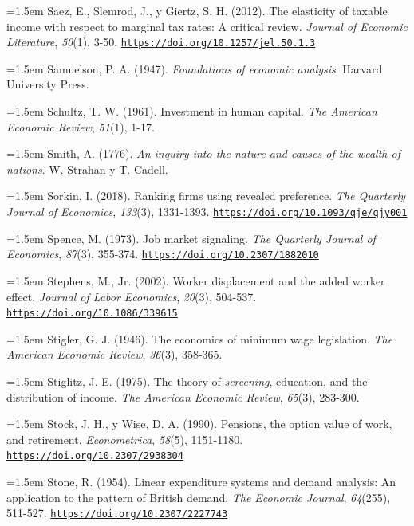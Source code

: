 \documentclass[10pt,a4paper]{article}
\begin{document}
\noindent\hangindent=1.5em Saez, E., Slemrod, J., y Giertz, S. H. (2012). The elasticity of taxable income with respect to marginal tax rates: A critical review. \textit{Journal of Economic Literature}, \textit{50}(1), 3-50. \href{https://doi.org/10.1257/jel.50.1.3}{\nolinkurl{https://doi.org/10.1257/jel.50.1.3}}

\noindent\hangindent=1.5em Samuelson, P. A. (1947). \textit{Foundations of economic analysis}. Harvard University Press.

\noindent\hangindent=1.5em Schultz, T. W. (1961). Investment in human capital. \textit{The American Economic Review}, \textit{51}(1), 1-17.

\noindent\hangindent=1.5em Smith, A. (1776). \textit{An inquiry into the nature and causes of the wealth of nations}. W. Strahan y T. Cadell.

\noindent\hangindent=1.5em Sorkin, I. (2018). Ranking firms using revealed preference. \textit{The Quarterly Journal of Economics}, \textit{133}(3), 1331-1393. \href{https://doi.org/10.1093/qje/qjy001}{\nolinkurl{https://doi.org/10.1093/qje/qjy001}}

\noindent\hangindent=1.5em Spence, M. (1973). Job market signaling. \textit{The Quarterly Journal of Economics}, \textit{87}(3), 355-374. \href{https://doi.org/10.2307/1882010}{\nolinkurl{https://doi.org/10.2307/1882010}}

\noindent\hangindent=1.5em Stephens, M., Jr. (2002). Worker displacement and the added worker effect. \textit{Journal of Labor Economics}, \textit{20}(3), 504-537. \href{https://doi.org/10.1086/339615}{\nolinkurl{https://doi.org/10.1086/339615}}

\noindent\hangindent=1.5em Stigler, G. J. (1946). The economics of minimum wage legislation. \textit{The American Economic Review}, \textit{36}(3), 358-365.

\noindent\hangindent=1.5em Stiglitz, J. E. (1975). The theory of \textit{screening}, education, and the distribution of income. \textit{The American Economic Review}, \textit{65}(3), 283-300.

\noindent\hangindent=1.5em Stock, J. H., y Wise, D. A. (1990). Pensions, the option value of work, and retirement. \textit{Econometrica}, \textit{58}(5), 1151-1180. \href{https://doi.org/10.2307/2938304}{\nolinkurl{https://doi.org/10.2307/2938304}}

\noindent\hangindent=1.5em Stone, R. (1954). Linear expenditure systems and demand analysis: An application to the pattern of British demand. \textit{The Economic Journal}, \textit{64}(255), 511-527. \href{https://doi.org/10.2307/2227743}{\nolinkurl{https://doi.org/10.2307/2227743}}
\end{document}
